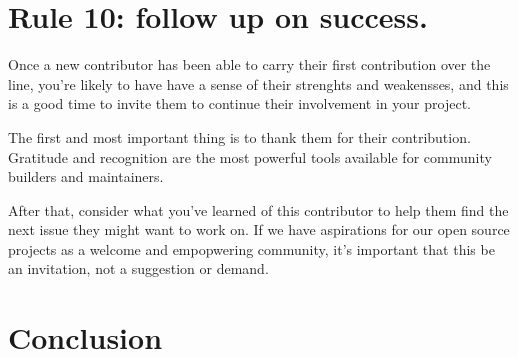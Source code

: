 \documentclass[10pt,letterpaper]{article}
\newcommand{\rulemajor}[1]{\section{#1}}
\begin{document}
\rulemajor{Rule 10: follow up on success.}

Once a new contributor has been able to carry their first contribution over the line, 
you're likely to have have a sense of their strenghts and weakensses,
and this is a good time to invite them to continue their involvement in your project.

The first and most important thing is to thank them for their contribution.
Gratitude and recognition are the most powerful tools available for community builders and maintainers. 

After that,
consider what you've learned of this contributor to help them find
the next issue they might want to work on.
If we have aspirations for our open source projects as a welcome and empopwering community,
it's important that this be an invitation,
not a suggestion or demand. 

\section*{Conclusion}


\end{document}
